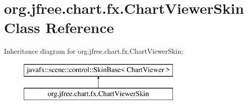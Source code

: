 \hypertarget{classorg_1_1jfree_1_1chart_1_1fx_1_1_chart_viewer_skin}{}\section{org.\+jfree.\+chart.\+fx.\+Chart\+Viewer\+Skin Class Reference}
\label{classorg_1_1jfree_1_1chart_1_1fx_1_1_chart_viewer_skin}
Inheritance diagram for org.\+jfree.\+chart.\+fx.\+Chart\+Viewer\+Skin\+:\begin{figure}[H]
\begin{center}
\leavevmode
\includegraphics[height=2.000000cm]{classorg_1_1jfree_1_1chart_1_1fx_1_1_chart_viewer_skin}
\end{center}
\end{figure}
